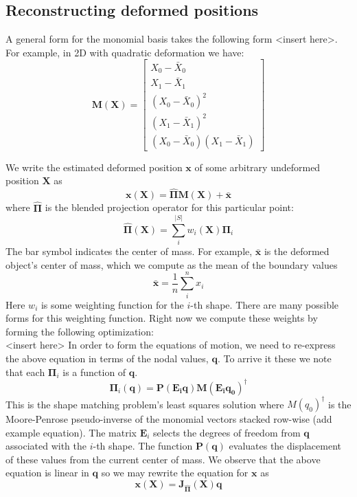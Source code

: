 \subsection{Reconstructing deformed positions}
A general form for the monomial basis takes the following form <insert here>. For example, in 2D with quadratic deformation we have:
\begin{equation}
    \mathbf{M(X)} =\begin{bmatrix}
    X_0 - \bar{X}_0  \\ 
    X_1 - \bar{X}_1  \\ 
    (X_0 - \bar{X}_0)^2  \\ 
    (X_1 - \bar{X}_1)^2  \\ 
    (X_0 - \bar{X}_0)(X_1 - \bar{X}_1) 
    \end{bmatrix} 
\end{equation}

    
We write the estimated deformed position $\mathbf{x}$ of some arbitrary undeformed position $\mathbf{X}$ as
\begin{equation}
     \mathbf{x}(\mathbf{X}) = \hat{\mathbf{\Pi}}\mathbf{M}(\mathbf{X}) + \bar{\mathbf{x}} 
\end{equation}
where $\mathbf{\hat{\Pi}}$ is the blended projection operator for this particular point:
\begin{equation}
    \hat{\mathbf{\Pi}}\mathbf{(X)} = \sum_i^{|S|}w_i(\mathbf{X})\mathbf{\Pi}_i 
\end{equation}
The bar symbol indicates the center of mass. For example, $\bar{\mathbf{x}}$ is the deformed object's center of mass, which we compute as the mean of the boundary values 
\begin{equation}
    \bar{\mathbf{x}} = \frac{1}{n}\sum_i^n x_i 
\end{equation}
Here $w_i$ is some weighting function for the $i$-th shape. There are many possible forms for this weighting function. Right now we compute these weights by forming the following optimization: \\
<insert here>
In order to form the equations of motion, we need to re-express the above equation in terms of the nodal values, $\mathbf{q}$. To arrive it these we note that each $\mathbf{\Pi}_i$ is a function of $\mathbf{q}$. 
\begin{equation}
    \mathbf{\Pi}_i(\mathbf{q}) = \mathbf{P(E_i q)M(E_i q_0)^{\dagger}}
\end{equation}
This is the shape matching problem's least squares solution where $M(q_0)^{\dagger}$ is the Moore-Penrose pseudo-inverse of the monomial vectors stacked row-wise (add example equation). The matrix $\mathbf{E}_i$ selects the degrees of freedom from $\mathbf{q}$ associated with the $i$-th shape. The function $\mathbf{P(q)}$ evaluates the displacement of these values from the current center of mass. We observe that the above equation is linear in $\mathbf{q}$ so we may rewrite the equation for $\mathbf{x}$ as 
\begin{equation}
    \mathbf{x(X)} = \mathbf{J_{\hat{\Pi}}(X)q}
\end{equation}

